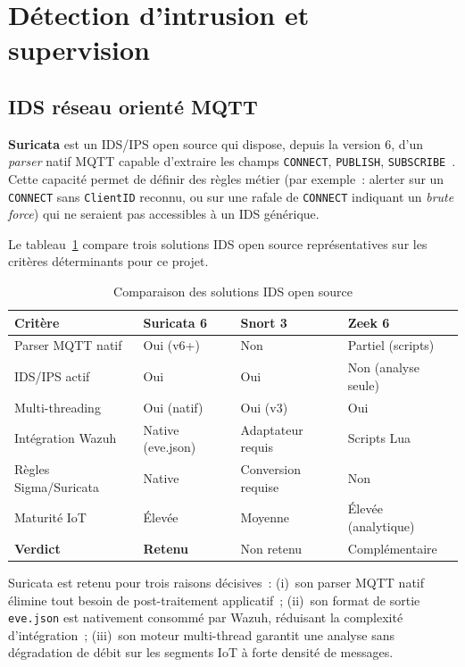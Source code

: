 \section{Détection d'intrusion et supervision}
\label{sec:ea-ids-siem}

\subsection{IDS réseau orienté MQTT}

\textbf{Suricata} est un IDS/IPS open source qui dispose, depuis la version 6, d'un \emph{parser} natif MQTT capable d'extraire les champs \texttt{CONNECT}, \texttt{PUBLISH}, \texttt{SUBSCRIBE}~\cite{suricata_mqtt}. Cette capacité permet de définir des règles métier (par exemple~: alerter sur un \texttt{CONNECT} sans \texttt{ClientID} reconnu, ou sur une rafale de \texttt{CONNECT} indiquant un \emph{brute force}) qui ne seraient pas accessibles à un IDS générique.

Le tableau~\ref{tab:ids-compare} compare trois solutions IDS open source représentatives sur les critères déterminants pour ce projet.

\begin{table}[!htbp]
\centering
\caption{Comparaison des solutions IDS open source}
\label{tab:ids-compare}
\small
\begin{tabularx}{\linewidth}{|l|X|X|X|}
\hline
\textbf{Critère} & \textbf{Suricata 6} & \textbf{Snort 3} & \textbf{Zeek 6} \\
\hline
Parser MQTT natif    & Oui (v6+)     & Non           & Partiel (scripts) \\ \hline
IDS/IPS actif        & Oui           & Oui           & Non (analyse seule) \\ \hline
Multi-threading      & Oui (natif)   & Oui (v3)      & Oui \\ \hline
Intégration Wazuh    & Native (eve.json) & Adaptateur requis & Scripts Lua \\ \hline
Règles Sigma/Suricata & Native       & Conversion requise & Non \\ \hline
Maturité IoT         & Élevée        & Moyenne       & Élevée (analytique) \\ \hline
\textbf{Verdict}     & \textbf{Retenu} & Non retenu   & Complémentaire \\ \hline
\end{tabularx}
\end{table}

Suricata est retenu pour trois raisons décisives~: (i)~son parser MQTT natif élimine tout besoin de post-traitement applicatif~; (ii)~son format de sortie \texttt{eve.json} est nativement consommé par Wazuh, réduisant la complexité d'intégration~; (iii)~son moteur multi-thread garantit une analyse sans dégradation de débit sur les segments IoT à forte densité de messages.

